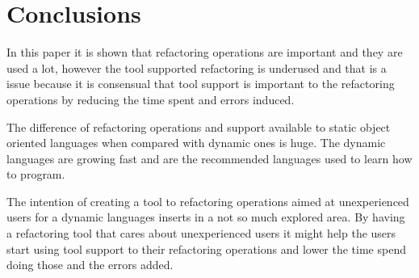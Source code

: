 
% 
% 

\section{Conclusions}



In this paper it is shown that refactoring operations are important and they are used a lot, however the tool supported refactoring is underused and that is a issue because it is consensual that tool support is important to the refactoring operations by reducing the time spent and errors induced.

The difference of refactoring operations and support available to static object oriented languages when compared with dynamic ones is huge. The dynamic languages are growing fast and are the recommended  languages used to learn how to program.

The intention of creating a tool to refactoring operations aimed at unexperienced users for a dynamic languages inserts in a not so much explored area. By having a refactoring tool that cares about unexperienced users it might help the users start using tool support to their refactoring operations and lower the time spend doing those and the errors added.
